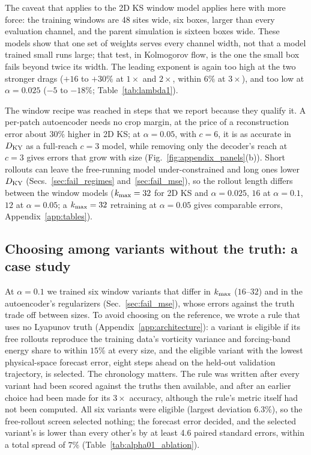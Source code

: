 The caveat that applies to the 2D KS window model applies here with more
force: the training windows are 48 sites wide, six boxes, larger than
every evaluation channel, and the parent simulation is sixteen boxes
wide. These models show that one set of weights serves every channel
width, not that a model trained small runs large; that test, in
Kolmogorov flow, is the one the small box fails beyond twice its width.
The leading exponent is again too high at the two stronger drags
($+16$ to $+30\%$ at $1\times$ and $2\times$, within $6\%$ at $3\times$), and too low at
$\alpha=0.025$ ($-5$ to $-18\%$; Table~\ref{tab:lambda1}).

The window recipe was reached in steps that we report because they
qualify it. A per-patch autoencoder needs no crop margin, at the price of
a reconstruction error about $30\%$ higher in 2D KS; at $\alpha=0.05$, with
$c=6$, it is as accurate in $D_{\mathrm{KY}}$ as a full-reach $c=3$ model, while removing
only the decoder's reach at $c=3$ gives errors that grow with size
(Fig.~\ref{fig:appendix_panels}(b)). Short rollouts can leave the
free-running model under-constrained and long ones lower $D_{\mathrm{KY}}$
(Secs.~\ref{sec:fail_regimes} and~\ref{sec:fail_mse}), so the rollout length
differs between the window models ($k_{\max}=32$ for 2D KS and $\alpha=0.025$,
$16$ at $\alpha=0.1$, $12$ at $\alpha=0.05$; a $k_{\max}=32$ retraining at
$\alpha=0.05$ gives comparable errors, Appendix~\ref{app:tables}).

\subsection{Choosing among variants without the truth: a case study}
\label{sec:canonical_results}

At $\alpha=0.1$ we trained six window variants that differ in $k_{\max}$
($16$--$32$) and in the autoencoder's regularizers (Sec.~\ref{sec:fail_mse}),
whose errors against the truth trade off between sizes. To avoid choosing
on the reference, we wrote a rule that uses no Lyapunov truth
(Appendix~\ref{app:architecture}): a variant is eligible if its free
rollouts reproduce the training data's vorticity variance and
forcing-band energy share to within $15\%$ at every size, and the eligible
variant with the lowest physical-space forecast error, eight steps ahead
on the held-out validation trajectory, is selected. The chronology
matters. The rule was written after every variant had been scored
against the truths then available, and after an earlier choice had been
made for its $3\times$ accuracy, although the rule's metric itself had not
been computed. All six variants were eligible (largest deviation
$6.3\%$), so the free-rollout screen selected nothing; the forecast error
decided, and the selected variant's is lower than every other's by at
least 4.6 paired standard errors, within a total spread of $7\%$
(Table~\ref{tab:alpha01_ablation}).

